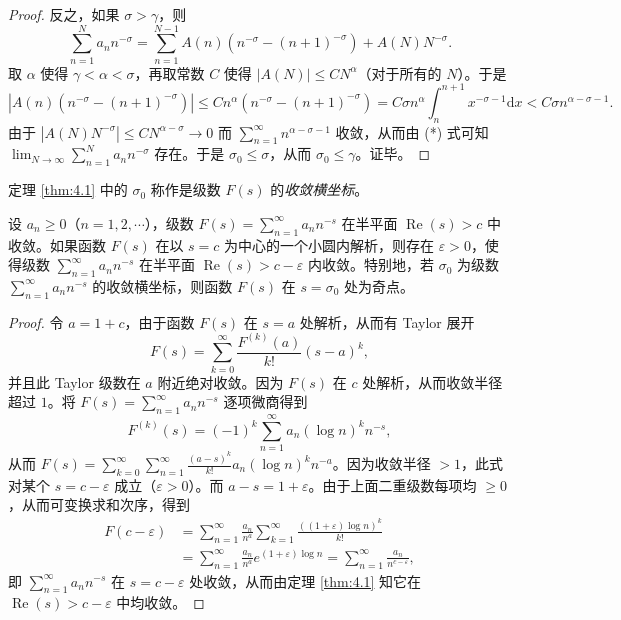 \begin{proof}
反之，如果 $\sigma>\gamma$，则
\begin{equation}\tag{*}
  \sum_{n=1}^{N}a_nn^{-\sigma}
  =\sum_{n=1}^{N-1}A(n)(n^{-\sigma}-(n+1)^{-\sigma})+A(N)N^{-\sigma}.
\end{equation}
取 $\alpha$ 使得 $\gamma<\alpha<\sigma$，再取常数 $C$ 使得 $|A(N)|\leqslant CN^{\alpha}$（对于所有的 $N$）。于是
\[
  |A(n)(n^{-\sigma}-(n+1)^{-\sigma})|\leqslant Cn^{\alpha}(n^{-\sigma}-(n+1)^{-\sigma})
  =C\sigma n^{\alpha}\int_n^{n+1}x^{-\sigma-1}\mathrm{d}x<C\sigma n^{\alpha-\sigma-1}.
\]
由于 $|A(N)N^{-\sigma}|\leqslant CN^{\alpha-\sigma}\to 0$ 而 $\sum_{n=1}^{\infty}n^{\alpha-\sigma-1}$ 收敛，从而由 (*) 式可知 $\lim_{N\to\infty}\sum_{n=1}^{N}a_nn^{-\sigma}$ 存在。于是 $\sigma_0\leqslant\sigma$，从而 $\sigma_0\leqslant\gamma$。证毕。
\end{proof}

\begin{remark}
定理 \ref{thm:4.1} 中的 $\sigma_0$ 称作是级数 $F(s)$ 的\emph{收敛横坐标}。
\end{remark}

\begin{theorem}\label{thm:4.2}
设 $a_n\geqslant 0$（$n=1,2,\cdots$），级数 $F(s)=\sum_{n=1}^{\infty}a_nn^{-s}$ 在半平面 $\operatorname{Re}(s)>c$ 中收敛。如果函数 $F(s)$ 在以 $s=c$ 为中心的一个小圆内解析，则存在 $\varepsilon>0$，使得级数 $\sum_{n=1}^{\infty}a_nn^{-s}$ 在半平面 $\operatorname{Re}(s)>c-\varepsilon$ 内收敛。特别地，若 $\sigma_0$ 为级数 $\sum_{n=1}^{\infty}a_nn^{-s}$ 的收敛横坐标，则函数 $F(s)$ 在 $s=\sigma_0$ 处为奇点。
\end{theorem}

\begin{proof}
令 $a=1+c$，由于函数 $F(s)$ 在 $s=a$ 处解析，从而有 Taylor 展开
\[
  F(s)=\sum_{k=0}^{\infty}\frac{F^{(k)}(a)}{k!}(s-a)^k,
\]
并且此 Taylor 级数在 $a$ 附近绝对收敛。因为 $F(s)$ 在 $c$ 处解析，从而收敛半径超过 $1$。将 $F(s)=\sum_{n=1}^{\infty}a_nn^{-s}$ 逐项微商得到
\[
  F^{(k)}(s)=(-1)^k\sum_{n=1}^{\infty}a_n(\log n)^kn^{-s},
\]
从而 $F(s)=\sum_{k=0}^{\infty}\sum_{n=1}^{\infty}\frac{(a-s)^k}{k!}a_n(\log n)^kn^{-a}$。因为收敛半径 $>1$，此式对某个 $s=c-\varepsilon$ 成立（$\varepsilon>0$）。而 $a-s=1+\varepsilon$。由于上面二重级数每项均 $\geqslant 0$，从而可变换求和次序，得到
\begin{align*}
  F(c-\varepsilon)&=\sum_{n=1}^{\infty}\frac{a_n}{n^a}\sum_{k=1}^{\infty}\frac{((1+\varepsilon)\log n)^k}{k!}\\
  &=\sum_{n=1}^{\infty}\frac{a_n}{n^a}e^{(1+\varepsilon)\log n}=\sum_{n=1}^{\infty}\frac{a_n}{n^{c-\varepsilon}},
\end{align*}
即 $\sum_{n=1}^{\infty}a_nn^{-s}$ 在 $s=c-\varepsilon$ 处收敛，从而由定理 \ref{thm:4.1} 知它在 $\operatorname{Re}(s)>c-\varepsilon$ 中均收敛。
\end{proof}

